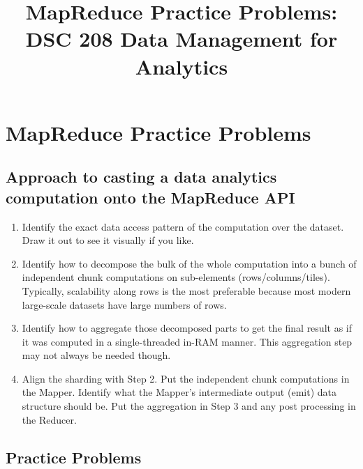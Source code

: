 \documentclass{article}
\title{MapReduce Practice Problems: DSC 208 Data Management for Analytics}
\author{}
\date{}
\begin{document}
\maketitle

\section*{MapReduce Practice Problems}

\subsection*{Approach to casting a data analytics computation onto the MapReduce API}
\begin{enumerate}[label=\textbf{Step \arabic*.}]
    \item Identify the exact data access pattern of the computation over the dataset. Draw it out to see it visually if you like.
    \item Identify how to decompose the bulk of the whole computation into a bunch of independent chunk computations on sub-elements (rows/columns/tiles). Typically, scalability along rows is the most preferable because most modern large-scale datasets have large numbers of rows.
    \item Identify how to aggregate those decomposed parts to get the final result as if it was computed in a single-threaded in-RAM manner. This aggregation step may not always be needed though.
    \item Align the sharding with Step 2. Put the independent chunk computations in the Mapper. Identify what the Mapper's intermediate output (emit) data structure should be. Put the aggregation in Step 3 and any post processing in the Reducer.
\end{enumerate}

\subsection*{Practice Problems}
\end{document}
